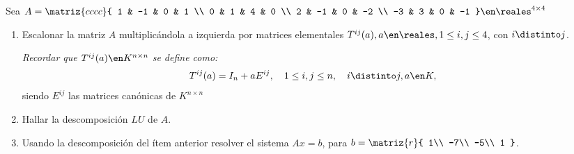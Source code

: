 \begin{enunciado}{\ejercicio}
  Sea $A =
    \matriz{cccc}{
      1 & -1 & 0 & 1 \\
      0 & 1 & 4 & 0 \\
      2 & -1 & 0 & -2 \\
      -3 & 3 & 0 & -1
    } \en \reales^{4 \times 4}$

  \begin{enumerate}[label=(\alph*)]
    \item Escalonar la matriz $A$ multiplicándola a izquierda por matrices
          elementales $T^{ij}(a), a \en \reales, 1\leq i, j \leq 4$, con $i \distinto j$.

          \textit{Recordar que $T^{ij}(a) \en K^{n \times n}$ se define como:}
          $$
            T^{ij}(a) = I_n + a E^{ij}, \quad 1\leq i,j \leq n,\quad i\distinto j, a \en K,
          $$
          siendo $E^{ij}$ las matrices canónicas de $K^{n \times n}$

    \item Hallar la descomposición $LU$ de $A$.

    \item\label{ej:2-item-c} Usando la descomposición del ítem anterior resolver el sistema $Ax = b$,
          para
          $b =
            \matriz{r}{
              1\\
              -7\\
              -5\\
              1
            }$.
  \end{enumerate}
\end{enunciado}

